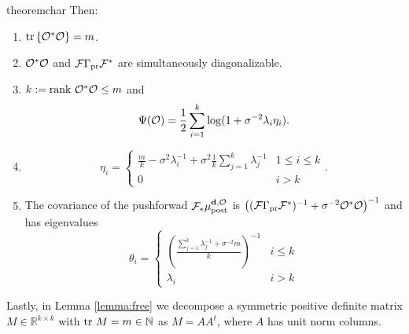 \begin{restatable}{theorem}{char}
  Then:
  \begin{enumerate}
  \item  $\textup{tr}\left \{\mathcal{O}^*\mathcal{O} \right \} = m$.
  \item $\mathcal{O}^*\mathcal{O}$ and $\mathcal{F}\Gamma_{\textup{pr}}\mathcal{F}^*$ are simultaneously
    diagonalizable.
  \item $k := \textup{rank}\  \mathcal{O}^*\mathcal{O} \leq m$ and
    \begin{equation*}
      \tar(\obs) = \frac12 \sum_{i=1}^{k} \log (1 + \sigma^{-2}\lambda_i\eta_i). %
    \end{equation*}
  \item
    \begin{equation*}
        \eta_i = \begin{cases}
          \frac{m}{k} - \sigma^2 \lambda_i^{-1} + \sigma^2 \frac{1}{k} \sum_{j=1}^k \lambda_j^{-1} & 1 \leq i \leq k \\
          0 & i > k 
        \end{cases}.
    \end{equation*}
  \item The covariance of the pushforwad $\mathcal{F}_{*} \mu_{\textup{post}}^{\mathbf{d}, \mathcal{O}}$ is $\left (
    (\mathcal{F} \Gamma_{\textup{pr}} \mathcal{F}^*)^{-1} + \sigma^{-2} \mathcal{O}^*\mathcal{O} \right )^{-1}$
    and has eigenvalues
    \begin{equation*}
      \theta_i =
      \begin{cases}
        \left(\frac{\sum_{j=1}^k \lambda_j^{-1} + \sigma^{-2}m}{k} \right )^{-1} & i \leq k \\
        \lambda_i &  i > k 
      \end{cases}
    \end{equation*}
  \end{enumerate}
\end{restatable}

Lastly, in Lemma \ref{lemma:free} we decompose a symmetric positive
definite matrix $M \in \mathbb{R}^{k \times k}$ with $\textup{tr}\ M = m \in
\mathbb{N}$ as $M = AA^t$, where $A$ has unit norm columns.



